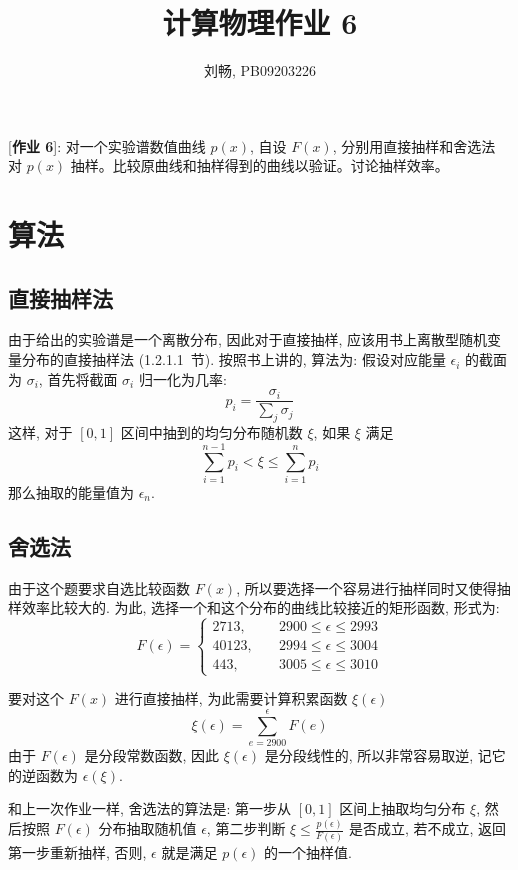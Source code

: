 \documentclass{ctexart}
\begin{document}
\title{计算物理作业 6}
\author{刘畅, PB09203226}
\maketitle

[{\bf 作业 6}]: 对一个实验谱数值曲线 $p(x)$, 自设 $F(x)$, 分别用直接抽样和舍选法
对 $p(x)$ 抽样。比较原曲线和抽样得到的曲线以验证。讨论抽样效率。

\section{算法}
\subsection{直接抽样法}
由于给出的实验谱是一个离散分布, 因此对于直接抽样, 应该用书上离散型随机变量分布的直接抽样法
(1.2.1.1~节). 按照书上讲的, 算法为: 假设对应能量 $\epsilon_i$ 的截面为 $\sigma_i$,
首先将截面 $\sigma_i$ 归一化为几率:
\begin{equation}\label{norm_prob}
p_i = \frac{\sigma_i}{\sum_j\sigma_j}
\end{equation}
这样, 对于 $[0,1]$ 区间中抽到的均匀分布随机数 $\xi$, 如果 $\xi$ 满足
\begin{equation}\label{samp_direct}
\sum_{i=1}^{n-1} p_i < \xi \le \sum_{i=1}^n p_i
\end{equation}
那么抽取的能量值为 $\epsilon_n$.

\subsection{舍选法}
由于这个题要求自选比较函数 $F(x)$, 所以要选择一个容易进行抽样同时又使得抽样效率比较大的.
为此, 选择一个和这个分布的曲线比较接近的矩形函数, 形式为:
\[
F(\epsilon) = \begin{cases}
2713, \quad &2900 \le \epsilon \le 2993 \\
40123, \quad &2994 \le \epsilon \le 3004 \\
443, \quad & 3005 \le \epsilon \le 3010
\end{cases}
\]

要对这个 $F(x)$ 进行直接抽样, 为此需要计算积累函数 $\xi(\epsilon)$
\[
\xi(\epsilon) = \sum_{e = 2900}^{\epsilon} F(e)
\]
由于 $F(\epsilon)$ 是分段常数函数, 因此 $\xi(\epsilon)$ 是分段线性的,
所以非常容易取逆, 记它的逆函数为 $\epsilon(\xi)$.

和上一次作业一样, 舍选法的算法是: 第一步从 $[0,1]$ 区间上抽取均匀分布 $\xi$,
然后按照 $F(\epsilon)$ 分布抽取随机值 $\epsilon$, 第二步判断 $\xi \le
\frac{p(\epsilon)}{F(\epsilon)}$ 是否成立, 若不成立, 返回第一步重新抽样,
否则, $\epsilon$ 就是满足 $p(\epsilon)$ 的一个抽样值.
\end{document}
